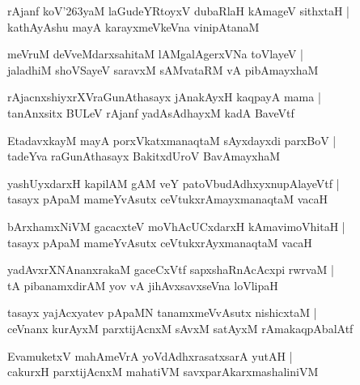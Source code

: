 \documentclass[twoside,12pt,openright]{book}
\def\S{\char'263}
\newcounter{shloka}[chapter]
\begin{document}
\begin{shloka}%
rAjanf koV\S yaM laGudeYRtoyxV dubaRlaH kAmageV sithxtaH |\\
kathAyAshu mayA karayxmeVkeVna vinipAtanaM
\end{shloka}

\begin{shloka}%
meVruM deVveMdarxsahitaM lAMgalAgerxVNa toVlayeV |\\
jaladhiM shoVSayeV saravxM sAMvataRM vA pibAmayxhaM 
\end{shloka}

\begin{shloka}%
rAjacnxshiyxrXVraGunAthasayx jAnakAyxH kaqpayA mama |\\
tanAnxsitx BULeV rAjanf yadAsAdhayxM kadA BaveVtf 
\end{shloka}

\begin{shloka}%
EtadavxkayM mayA porxVkatxmanaqtaM sAyxdayxdi parxBoV |\\
tadeYva raGunAthasayx BakitxdUroV BavAmayxhaM 
\end{shloka}

\begin{shloka}%
yashUyxdarxH kapilAM gAM veY patoVbudAdhxyxnupAlayeVtf |\\
tasayx pApaM mameYvAsutx ceVtukxrAmayxmanaqtaM vacaH 
\end{shloka}

\begin{shloka}%
bArxhamxNiVM gacacxteV moVhAcUCxdarxH kAmavimoVhitaH |\\
tasayx pApaM mameYvAsutx ceVtukxrAyxmanaqtaM vacaH
\end{shloka}

\begin{shloka}%
yadAvxrXNAnanxrakaM gaceCxVtf sapxshaRnAcAcxpi rwrvaM |\\
tA pibanamxdirAM yov vA jihAvxsavxseVna loVlipaH 
\end{shloka}

\begin{shloka}%
tasayx yajAcxyatev pApaMN tanamxmeVvAsutx nishicxtaM |\\
ceVnanx kurAyxM parxtijAcnxM sAvxM satAyxM rAmakaqpAbalAtf 
\end{shloka}

\begin{shloka}%
EvamuketxV mahAmeVrA yoVdAdhxrasatxsarA yutAH |\\
cakurxH parxtijAcnxM mahatiVM savxparAkarxmashaliniVM 
\end{shloka}
\end{document}
